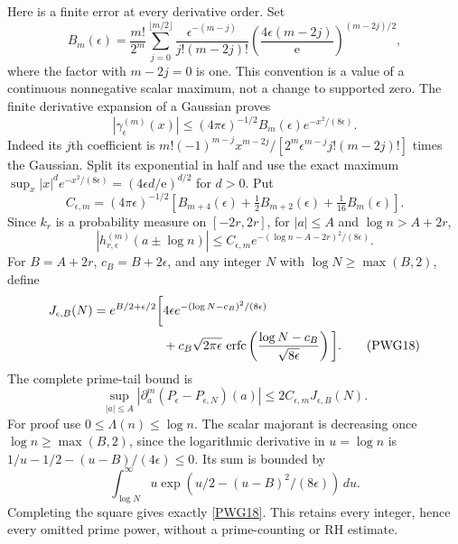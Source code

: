 \documentclass[11pt,a4paper]{article}
\theoremstyle{definition}\newtheorem{definition}[theorem]{Definition}
\begin{document}
Here is a finite error at every derivative order. Set
\begin{equation}
 B_m(\epsilon)=\frac{m!}{2^m}
 \sum_{j=0}^{\lfloor m/2\rfloor}
 \frac{\epsilon^{-(m-j)}}{j!(m-2j)!}
 \left(\frac{4\epsilon(m-2j)}{\mathrm e}\right)^{(m-2j)/2},
                                                               \tag{PWG15}\label{PWG15}
\end{equation}
where the factor with $m-2j=0$ is one. This convention is a value of a continuous nonnegative scalar maximum, not a change to supported zero. The finite derivative expansion of a Gaussian proves
\begin{equation}
 |\gamma_\epsilon^{(m)}(x)|\le
 (4\pi\epsilon)^{-1/2}B_m(\epsilon)e^{-x^2/(8\epsilon)}.
                                                               \tag{PWG16}\label{PWG16}
\end{equation}
Indeed its $j$th coefficient is
$m!(-1)^{m-j}x^{m-2j}/[2^m\epsilon^{m-j}j!(m-2j)!]$ times the Gaussian. Split its exponential in half and use the exact maximum
$\sup_x|x|^d e^{-x^2/(8\epsilon)}=(4\epsilon d/\mathrm e)^{d/2}$ for $d>0$.
Put
\begin{equation}
 C_{\epsilon,m}=(4\pi\epsilon)^{-1/2}
 \left[B_{m+4}(\epsilon)+\tfrac12B_{m+2}(\epsilon)
                                      +\tfrac1{16}B_m(\epsilon)\right].
                                                               \tag{PWG17}\label{PWG17}
\end{equation}
Since $k_r$ is a probability measure on $[-2r,2r]$, for $|a|\le A$ and $\log n>A+2r$,
\[
 |h_{r,\epsilon}^{(m)}(a\pm\log n)|
 \le C_{\epsilon,m}
        e^{-(\log n-A-2r)^2/(8\epsilon)}.
\]
For $B=A+2r$, $c_B=B+2\epsilon$, and any integer $N$ with
$\log N\ge\max(B,2)$, define
\begin{align}
 J_{\epsilon,B}(N)=e^{B/2+\epsilon/2}
 \bigg[&4\epsilon e^{-(\log N-c_B)^2/(8\epsilon)}\notag\\
 &+c_B\sqrt{2\pi\epsilon}\,
  \operatorname{erfc}\left(\frac{\log N-c_B}{\sqrt{8\epsilon}}\right)\bigg].
                                                               \tag{PWG18}\label{PWG18}
\end{align}
The complete prime-tail bound is
\begin{equation}
 \boxed{\sup_{|a|\le A}|\partial_a^m(P_\epsilon-P_{\epsilon,N})(a)|
       \le2C_{\epsilon,m}J_{\epsilon,B}(N).}                 \tag{PWG19}\label{PWG19}
\end{equation}
For proof use $0\le\Lambda(n)\le\log n$. The scalar majorant is decreasing once $\log n\ge\max(B,2)$, since the logarithmic derivative in $u=\log n$ is
$1/u-1/2-(u-B)/(4\epsilon)\le0$. Its sum is bounded by
\[
 \int_{\log N}^\infty u\exp\left(u/2-(u-B)^2/(8\epsilon)\right)\,du.
\]
Completing the square gives exactly \eqref{PWG18}. This retains every integer, hence every omitted prime power, without a prime-counting or RH estimate.
\end{document}

